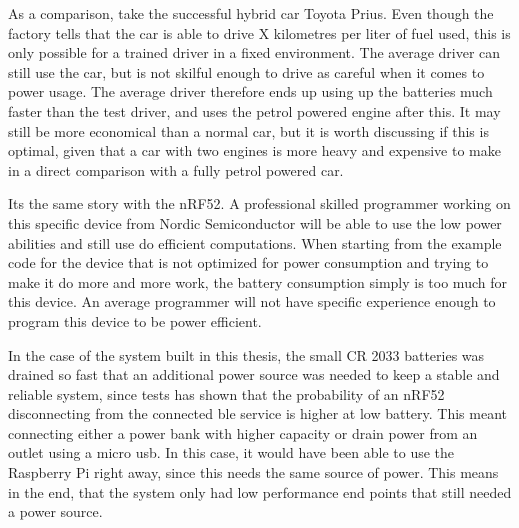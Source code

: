 As a comparison, take the successful hybrid car Toyota Prius. Even though the factory tells that the car is able to drive X kilometres per liter of fuel used, this is only possible for a trained driver in a fixed environment. The average driver can still use the car, but is not skilful enough to drive as careful when it comes to power usage. The average driver therefore ends up using up the batteries much faster than the test driver, and uses the petrol powered engine after this. It may still be more economical than a normal car, but it is worth discussing if this is optimal, given that a car with two engines is more heavy and expensive to make in a direct comparison with a fully petrol powered car. 

Its the same story with the nRF52. A professional skilled programmer working on this specific device from Nordic Semiconductor will be able to use the low power abilities and still use do efficient computations. When starting from the example code for the device that is not optimized for power consumption and trying to make it do more and more work, the battery consumption simply is too much for this device. An average programmer will not have specific experience enough to program this device to be power efficient. 

In the case of the system built in this thesis, the small CR 2033 batteries was drained so fast that an additional power source was needed to keep a stable and reliable system, since tests has shown that the probability of an nRF52 disconnecting from the connected \gls{ble} service is higher at low battery. This meant connecting either a power bank with higher capacity or drain power from an outlet using a micro \gls{usb}. In this case, it would have been able to use the Raspberry Pi right away, since this needs the same source of power. This means in the end, that the system only had low performance end points that still needed a power source. 




